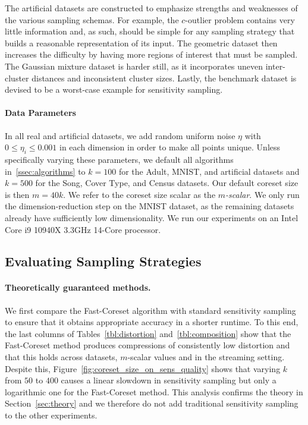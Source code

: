 The artificial datasets are constructed to emphasize strengths and weaknesses of the various sampling schemas. For example, the $c$-outlier problem contains
very little information and, as such, should be simple for any sampling strategy that builds a reasonable representation of its input. The geometric dataset
then increases the difficulty by having more regions of interest that must be sampled. The Gaussian mixture dataset is
harder still, as it incorporates uneven inter-cluster distances and inconsistent cluster sizes. Lastly, the benchmark dataset is devised to be a worst-case
example for sensitivity sampling.

\paragraph*{Data Parameters}
\label{app:data_params}

In all real and artificial datasets, we add random uniform noise $\eta$ with $0 \leq \eta_i \leq 0.001$ in each dimension in order to make all points unique.
Unless specifically varying these parameters, we default all algorithms in~\ref{ssec:algorithms} to $k=100$ for the Adult, MNIST, and artificial datasets and
$k=500$ for the Song, Cover Type, and Census datasets. Our default coreset size is then $m = 40k$. We refer to the coreset size scalar as the \emph{$m$-scalar}.
We only run the dimension-reduction step on the MNIST dataset, as the remaining datasets already have sufficiently low dimensionality.  We run our experiments
on an Intel Core i9 10940X 3.3GHz 14-Core processor.

\subsection{Evaluating Sampling Strategies}
\label{ssec:alg_qualities}

\paragraph*{Theoretically guaranteed methods.}

We first compare the Fast-Coreset algorithm with standard sensitivity sampling to ensure that it obtains appropriate accuracy in a shorter runtime.  To this
end, the last columns of Tables~\ref{tbl:distortion} and~\ref{tbl:composition} show that the Fast-Coreset method produces compressions of consistently low
distortion and that this holds across datasets, $m$-scalar values and in the streaming setting.  Despite this, Figure~\ref{fig:coreset_size_on_sens_quality}
shows that varying $k$ from $50$ to $400$ causes a linear slowdown in sensitivity sampling but only a logarithmic one for the Fast-Coreset method. This analysis
confirms the theory in Section~\ref{sec:theory} and we therefore do not add traditional sensitivity sampling to the other experiments.

